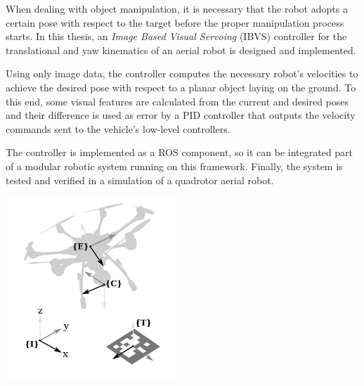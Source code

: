 
When dealing with object manipulation, it is necessary that the robot adopts a certain pose with respect to the target before the proper manipulation process starts. In this thesis, an \emph{Image Based Visual Servoing} (IBVS) controller for the translational and yaw kinematics of an aerial robot is designed and implemented. 

Using only image data, the controller computes the necessary robot's velocities to achieve the desired pose with respect to a planar object laying on the ground. To this end, some visual features are calculated from the current and desired poses and their difference is used as error by a PID controller that outputs the velocity commands sent to the vehicle's low-level controllers.

The controller is implemented as a ROS component, so it can be integrated part of a modular robotic system running on this framework. Finally, the system is tested and verified in a simulation of a quadrotor aerial robot.

\begin{center}
	\includegraphics[keepaspectratio, width=6.5cm]{content/frames_bw.png}
\end{center}